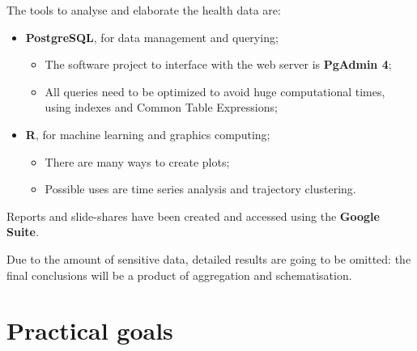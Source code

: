 The tools to analyse and elaborate the health data are:
\begin{itemize}
	\item \textbf{PostgreSQL}, for data management and querying;
		\begin{itemize}
			\item The software project to interface with the web server is \textbf{PgAdmin 4};
			\item All queries need to be optimized to avoid huge computational times, using indexes and Common Table Expressions;
		\end{itemize}
	\item \textbf{R}, for machine learning and graphics computing;
	\begin{itemize}
		\item There are many ways to create plots;
		\item Possible uses are time series analysis and trajectory clustering.
	\end{itemize}
\end{itemize}

Reports and slide-shares have been created and accessed using the \textbf{Google Suite}.

Due to the amount of sensitive data, detailed results are going to be omitted: the final conclusions will be a product of aggregation and schematisation.

\section{Practical goals}
